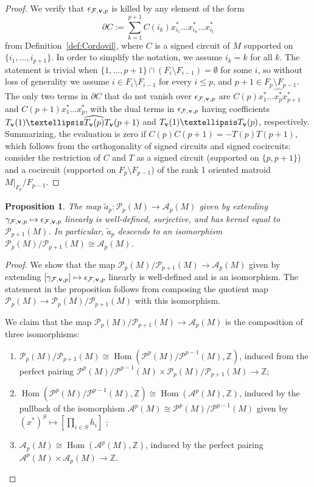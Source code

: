 \documentclass{amsart}
\newtheorem{proposition}[theorem]{Proposition}
\newcommand\Acal{{\mathcal A}}
\newcommand\Fcal{{\mathcal F}}
\newcommand\Pcal{{\mathcal P}}
\newcommand\vv{{\bf v}}
\newcommand\ZZ{{\mathbb Z}}
\DeclareMathOperator{\Hom}{Hom}
\begin{document}
{\begin{proof}
    We verify that $\epsilon_{\Fcal,\vv,p}$ is killed by any element of the form $$\partial C:=\sum_{k=1}^{p+1} C(i_k) x^*_{i_1}\ldots\widehat{x^*_{i_k}}\ldots x^*_{i_t}$$ from Definition~\ref{def:Cordovil}, where $C$ is a signed circuit of $M$ supported on $\{i_1,\ldots,i_{p+1}\}$. In order to simplify the notation, we assume $i_k=k$ for all $k$.
    The statement is trivial when $\{1,\ldots,p+1\}\cap (F_i\setminus F_{i-1})=\emptyset$ for some $i$, so without loss of generality we assume $i\in F_i\setminus F_{i-1}$ for every $i\leq p$, and $p+1\in F_p\setminus F_{p-1}$. The only two terms in $\partial C$ that do not vanish over $\epsilon_{\Fcal,\vv,p}$ are $C(p)x_1^*\ldots \widehat{x_p^*}x_{p+1}^*$ and $C(p+1)x_1^*\ldots x_p^*$, with the dual terms in $\epsilon_{\Fcal,\vv,p}$ having coefficients $T_\vv(1)\ldots \widehat{T_\vv(p)}T_\vv(p+1)$ and $T_\vv(1)\ldots T_\vv(p)$, respectively. 
    Summarizing, the evaluation is zero if $C(p)C(p+1)=-T(p)T(p+1)$, which follows from the orthogonality of signed circuits and signed cocircuits: consider the restriction of $C$ and $T$ as a signed circuit (supported on $\{p,p+1\}$) and a cocircuit (supported on $F_p\setminus F_{p-1}$) of the rank 1 oriented matroid $M|_{F_p}/F_{p-1}$.
\end{proof}

\begin{proposition} \label{prop:gamma_epsilon}
    The map $\tilde{a}_p:\Pcal_p(M) \rightarrow\Acal_p(M)$ given by extending $\gamma_{\Fcal,\vv,p}\mapsto \epsilon_{\Fcal,\vv,p}$ linearly is well-defined, surjective, and has kernel equal to $\Pcal_{p+1}(M)$. In particular, $\tilde{a}_p$ descends to an isomorphism $\Pcal_p(M)/\Pcal_{p+1}(M)\cong \Acal_p(M)$. 
\end{proposition}

\begin{proof}
    We show that the map $\Pcal_p(M)/\Pcal_{p+1}(M)\rightarrow\Acal_p(M)$ given by extending $[\gamma_{\Fcal,\vv,p}]\mapsto \epsilon_{\Fcal,\vv,p}$ linearly is well-defined and is an isomorphism. The statement in the proposition follows from composing the quotient map $\Pcal_p(M)\rightarrow\Pcal_p(M)/\Pcal_{p+1}(M)$ with this isomorphism.

    We claim that the map $\Pcal_p(M)/\Pcal_{p+1}(M)\rightarrow\Acal_p(M)$ is the composition of three isomorphisms: 
    \begin{enumerate}
\item  $\Pcal_p(M)/\Pcal_{p+1}(M)\cong \Hom(\Pcal^p(M)/\Pcal^{p-1}(M), \ZZ)$, induced from the perfect pairing $\Pcal^p(M)/\Pcal^{p-1}(M)\times \Pcal_p(M)/\Pcal_{p+1}(M)\rightarrow\ZZ$; 
\item $\Hom(\Pcal^p(M)/\Pcal^{p-1}(M), \ZZ)\cong \Hom(\Acal^p(M), \ZZ)$, induced by the pullback of the isomorphism $\Acal^p(M)\cong \Pcal^p(M)/\Pcal^{p-1}(M)$ given by $(x^*)^S\mapsto [\prod_{i\in S} h_i]$ \cite[Theorem~5.9]{Mose17}; 
\item $\Acal_p(M)\cong \Hom(\Acal^p(M), \ZZ)$, induced by the perfect pairing $\Acal^p(M)\times \Acal_p(M)\rightarrow\ZZ$.
    \end{enumerate}


\end{proof}}
\end{document}
